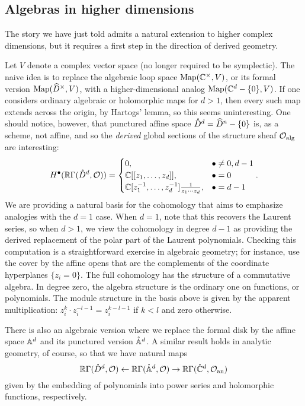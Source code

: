 \documentclass[11pt]{amsart}
\begin{document}
\subsection{Algebras in higher dimensions }
\label{s:alghigh}

The story we have just told admits a natural extension to higher complex dimensions,
but it requires a first step in the direction of derived geometry.

Let $V$ denote a complex vector space (no longer required to be symplectic).
The naive idea is to replace the algebraic loop space $\Map(\CC^\times,  V)$, or its formal version $\Map(\Hat{D}^\times, V)$, with a higher-dimensional analog $\Map(\CC^d -\{0\}, V)$.
If one considers ordinary algebraic or holomorphic maps for $d > 1$, 
then every such map extends across the origin, by Hartogs' lemma,
so this seems uninteresting.
One should notice, however, that punctured affine space $\mathring{D}^d = \Hat{D}^n -\{0\}$ is, as a scheme, not affine, 
and so the {\em derived} global sections of the structure sheaf $\cO_{\rm alg}$ are interesting:
\[
H^\bu(\RR \Gamma(\mathring{D}^d, \cO)) = \begin{cases} 
0, & \bu \neq 0, d-1 \\ 
\CC[[z_1,\ldots,z_d]], & \bu = 0 \\ 
\CC[z_1^{-1},\ldots,z_d^{-1}] \frac{1}{z_1 \cdots z_d}, & \bu = d-1 
\end{cases} .
\]
We are providing a natural basis for the cohomology 
that aims to emphasize analogies with the $d=1$ case.
When $d=1$, note that this recovers the Laurent series,
so when $d > 1$, 
we view the cohomology in degree $d-1$ as providing the derived replacement of the polar part of the Laurent polynomials.
Checking this computation is a straightforward exercise in algebraic geometry;
for instance, use the cover by the affine opens that are the complements of the coordinate hyperplanes $\{z_i =0\}$.
The full cohomology has the structure of a commutative algebra. 
In degree zero, the algebra structure is the ordinary one on functions, or polynomials.
The module structure in the basis above is given by the apparent multiplication: $z_i^k \cdot z_i^{-l-1} = z_i^{k-l-1}$ if $k < l$ and zero otherwise.

There is also an algebraic version where we replace the formal disk by the affine space $\AA^d$ and its punctured version $\mathring{\AA}^d$.
A similar result holds in analytic geometry, of course,
so that we have natural maps
\[
\RR \Gamma(\mathring{D}^d, \cO) \leftarrow \RR \Gamma(\mathring{\AA}^d, \cO) \to \RR \Gamma(\mathring{\CC}^d, \cO_{\rm an}) 
\]
given by the embedding of polynomials into power series and holomorphic functions, respectively.
\end{document}
